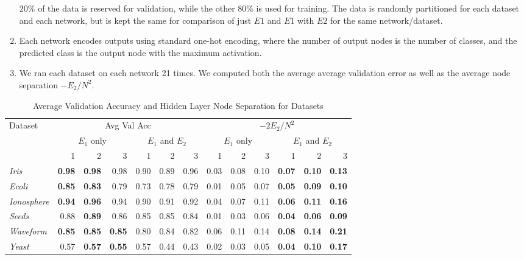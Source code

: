 \begin{enumerate}
  $20\%$ of the data is reserved for validation, while the other $80\%$ is
  used for training. The data is randomly partitioned for each dataset and
  each network, but is kept the same for comparison of just $E1$ and $E1$
  with $E2$ for the same network/dataset.
\item
  Each network encodes outputs using standard one-hot encoding, where the number
  of output nodes is the number of classes, and the predicted class is the
  output node with the maximum activation.
\item
  We ran each dataset on each network 21 times. We computed both the average
  average validation error as well as the average node separation
  $-E_2/N^2$.
\end{enumerate}

\begin{table*}[t!]
  \centering
  \small
  \begin{tabular}{|l|r|r|r|r|r|r|r|r|r|r|r|r|}
    \hline
    Dataset & 
    \multicolumn{6}{c|}{Avg Val Acc} & 
    \multicolumn{6}{c|}{$-2E_2/N^2$} \\
    \cline{2-13}
    & \multicolumn{3}{c|}{$E_1$ only} &
    \multicolumn{3}{c|}{$E_1$ and $E_2$} &
    \multicolumn{3}{c|}{$E_1$ only} &
    \multicolumn{3}{c|}{$E_1$ and $E_2$} \\
    \cline{2-13}
    & 1 & 2 & 3 & 1 & 2 & 3 & 1 & 2 & 3 & 1 & 2 & 3 \\
    \hline
    \textit{Iris} & \textbf{0.98} & \textbf{0.98} & 0.98 & 0.90 & 0.89 & 0.96 & 0.03 &0.08 & 0.10 & \textbf{0.07} & \textbf{0.10} & \textbf{0.13} \\
    \textit{Ecoli} & \textbf{0.85} & \textbf{0.83} & 0.79 & 0.73 & 0.78 & 0.79 & 0.01 & 0.05 & 0.07 & \textbf{0.05} & \textbf{0.09} & \textbf{0.10} \\
    \textit{Ionosphere} & \textbf{0.94} & \textbf{0.96} & 0.94 & 0.90 & 0.91 & 0.92 & 0.04 & 0.07 & 0.11 & \textbf{0.06} & \textbf{0.11} & \textbf{0.16} \\
    \textit{Seeds} & 0.88 & \textbf{0.89} & 0.86 & 0.85 & 0.85 & 0.84 & 0.01 & 0.03 & 0.06 & \textbf{0.04} & \textbf{0.06} & \textbf{0.09} \\
    \textit{Waveform} & \textbf{0.85} & \textbf{0.85} & \textbf{0.85} & 0.80 & 0.84 & 0.82 & 0.06 & 0.11 & 0.14 & \textbf{0.08} & \textbf{0.14} & \textbf{0.21} \\
    \textit{Yeast} & 0.57 & \textbf{0.57} & \textbf{0.55} & 0.57 & 0.44 & 0.43 & 0.02 & 0.03 & 0.05 & \textbf{0.04} & \textbf{0.10} & \textbf{0.17} \\
    \hline
  \end{tabular}
  \caption{Average Validation Accuracy and Hidden Layer Node Separation for Datasets }
  \label{tab:e1_e2_avgs}  
\end{table*}

